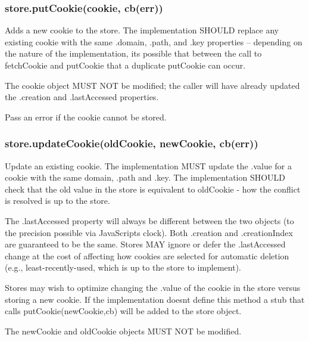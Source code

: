 \subsubsection*{{\ttfamily store.\+put\+Cookie(cookie, cb(err))}}

Adds a new cookie to the store. The implementation S\+H\+O\+U\+L\+D replace any existing cookie with the same {\ttfamily .domain}, {\ttfamily .path}, and {\ttfamily .key} properties -- depending on the nature of the implementation, it\textquotesingle{}s possible that between the call to {\ttfamily fetch\+Cookie} and {\ttfamily put\+Cookie} that a duplicate {\ttfamily put\+Cookie} can occur.

The {\ttfamily cookie} object M\+U\+S\+T N\+O\+T be modified; the caller will have already updated the {\ttfamily .creation} and {\ttfamily .last\+Accessed} properties.

Pass an error if the cookie cannot be stored.

\subsubsection*{{\ttfamily store.\+update\+Cookie(old\+Cookie, new\+Cookie, cb(err))}}

Update an existing cookie. The implementation M\+U\+S\+T update the {\ttfamily .value} for a cookie with the same {\ttfamily domain}, {\ttfamily .path} and {\ttfamily .key}. The implementation S\+H\+O\+U\+L\+D check that the old value in the store is equivalent to {\ttfamily old\+Cookie} -\/ how the conflict is resolved is up to the store.

The {\ttfamily .last\+Accessed} property will always be different between the two objects (to the precision possible via Java\+Script\textquotesingle{}s clock). Both {\ttfamily .creation} and {\ttfamily .creation\+Index} are guaranteed to be the same. Stores M\+A\+Y ignore or defer the {\ttfamily .last\+Accessed} change at the cost of affecting how cookies are selected for automatic deletion (e.\+g., least-\/recently-\/used, which is up to the store to implement).

Stores may wish to optimize changing the {\ttfamily .value} of the cookie in the store versus storing a new cookie. If the implementation doesn\textquotesingle{}t define this method a stub that calls {\ttfamily put\+Cookie(new\+Cookie,cb)} will be added to the store object.

The {\ttfamily new\+Cookie} and {\ttfamily old\+Cookie} objects M\+U\+S\+T N\+O\+T be modified.

